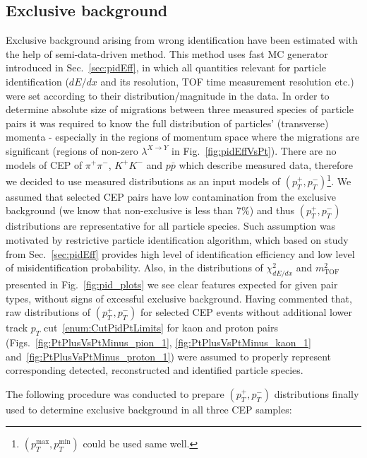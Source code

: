 \subsection{Exclusive background}\label{sec:exclBkgdDetermination}

Exclusive background arising from wrong identification have been estimated with the help of semi-data-driven method. This method uses fast MC generator introduced in Sec.~\ref{sec:pidEff}, in which all quantities relevant for particle identification ($dE/dx$ and its resolution, TOF time measurement resolution etc.) were set according to their distribution/magnitude in the data. In order to determine absolute size of migrations between three measured species of particle pairs it was required to know the full distribution of particles' (transverse) momenta - especially in the regions of momentum space where the migrations are significant (regions of non-zero $\lambda^{X\rightarrow Y}$ in Fig.~\ref{fig:pidEffVsPt}). There are no models of CEP of $\pi^{+}\pi^{-}$, $K^{+}K^{-}$ and $p\bar{p}$ which describe measured data, therefore we decided to use measured distributions as an input models of $(p_{T}^{+}, p_{T}^{-})$\footnote{$(p_{T}^{\text{max}}, p_{T}^{\text{min}})$ could be used same well.}. We assumed that selected CEP pairs have low contamination from the exclusive background (we know that non-exclusive is less than 7\%) and thus $(p_{T}^{+}, p_{T}^{-})$ distributions are representative for all particle species. Such assumption was motivated by restrictive particle identification algorithm, which based on study from Sec.~\ref{sec:pidEff} provides high level of identification efficiency and low level of misidentification probability. Also, in the distributions of $\chi^{2}_{dE/dx}$ and $m^{2}_{\text{TOF}}$ presented in Fig.~\ref{fig:pid_plots} we see clear features expected for given pair types, without signs of excessful exclusive background. Having commented that, raw distributions of $(p_{T}^{+}, p_{T}^{-})$ for selected CEP events without additional lower track $p_{T}$ cut~\ref{enum:CutPidPtLimits} for kaon and proton pairs (Figs.~\ref{fig:PtPlusVsPtMinus_pion_1}, \ref{fig:PtPlusVsPtMinus_kaon_1} and~\ref{fig:PtPlusVsPtMinus_proton_1}) were assumed to properly represent corresponding detected, reconstructed and identified particle species.

The following procedure was conducted to prepare $(p_{T}^{+}, p_{T}^{-})$ distributions finally used to determine exclusive background in all three CEP samples:

